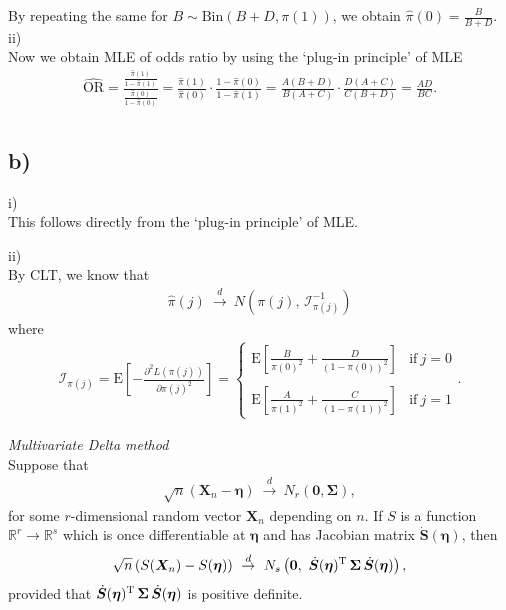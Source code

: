 \documentclass[a4paper]{article}
\newcommand{\E}{\mathrm{E}}
\begin{document}
By repeating the same for $B \sim \mathrm{Bin}(B+D,\pi(1))$, we obtain $\widehat{\pi}(0) = \frac{B}{B+D}$.\\


ii)\\
Now we obtain MLE of odds ratio by using the `plug-in principle' of MLE
\begin{align*}
\widehat{\mathrm{OR}} = \frac{\frac{\widehat{\pi}(1)}{1-\widehat{\pi}(1)}}{\frac{\widehat{\pi}(0)}{1-\widehat{\pi}(0)}} = \frac{\widehat{\pi}(1)}{\widehat{\pi}(0)} \cdot \frac{1-\widehat{\pi}(0)}{1-\widehat{\pi}(1)} = \frac{A(B+D)}{B(A+C)}\cdot\frac{D(A+C)}{C(B+D)} = \frac{AD}{BC}.\\
\end{align*}

\vspace{\baselineskip}
\subsection{b)}

i)\\
This follows directly from the `plug-in principle' of MLE.


ii)\\

By CLT, we know that
\begin{align*}
\widehat{\pi}(j) ~\overset{d}{\to}~ N\left(\pi(j), \, \mathcal{I}_{\pi(j)}^{-1}\right)
\end{align*}
where
\begin{align*}
\mathcal{I}_{\pi(j)} = \E\left[-\frac{\partial^{2} L(\pi(j))}{\partial \pi(j)^2}\right] =
\begin{cases}
\E\left[\frac{B}{\pi(0)^{2}} + \frac{D}{(1-\pi(0))^{2}}\right] & \text{if}~ j = 0\\
\\
\E\left[\frac{A}{\pi(1)^{2}} + \frac{C}{(1-\pi(1))^{2}}\right] & \text{if}~ j = 1
\end{cases}.
\end{align*}

\vspace{0.5cm}
\begin{framed}
\textit{Multivariate Delta method}\\

Suppose that
\begin{align*}
\sqrt{n}(\bm{X}_{n} - \bm{\eta}) ~\overset{d}{\to}~ N_{r}\left(\bm{0}, \bm{\Sigma}\right),
\end{align*}
for some $r$-dimensional random vector $\bm{X}_{n}$ depending on $n$. If $S$ is a function $\mathbb{R}^{r} \to \mathbb{R}^{s}$ which is once differentiable at $\bm{\eta}$ and has Jacobian matrix $\dot{\bm{S}}(\bm{\eta})$, then
\begin{align*}
\sqrt{n}\left(S(\bm{X}_{n}) - S(\bm{\eta})\right) ~\overset{d}{\to}~ N_{s}\left(\bm{0},~ \dot{\bm{S}}(\bm{\eta})^{\rm T} \, \bm{\Sigma} \, \dot{\bm{S}}(\bm{\eta})\right),
\end{align*}
provided that $\dot{\bm{S}}(\bm{\eta})^{\rm T} \, \bm{\Sigma} \, \dot{\bm{S}}(\bm{\eta})$ is positive definite.
\end{framed}
\end{document}
